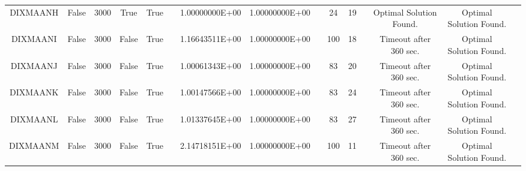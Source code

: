 \begin{longtable}{ccccccccccccccc}
	\cellcolor{default2} DIXMAANH& \cellcolor{default2} False& \cellcolor{default2} 3000& \cellcolor{default2} True& \cellcolor{default2} True& \cellcolor{header} & \cellcolor{best} 1.00000000E+00& \cellcolor{best} 1.00000000E+00& \cellcolor{header} & \cellcolor{ok} 24& \cellcolor{best} 19& \cellcolor{header} & \cellcolor{default2} Optimal Solution Found.& \cellcolor{default2} Optimal Solution Found.& \cellcolor{header} \\
	\cellcolor{default1} DIXMAANI& \cellcolor{default1} False& \cellcolor{default1} 3000& \cellcolor{default1} False& \cellcolor{default1} True& \cellcolor{header} & \cellcolor{poor} 1.16643511E+00& \cellcolor{best} 1.00000000E+00& \cellcolor{header} & \cellcolor{poor} 100& \cellcolor{best} 18& \cellcolor{header} & \cellcolor{default1} Timeout after 360 sec.& \cellcolor{default1} Optimal Solution Found.& \cellcolor{header} \\
	\cellcolor{default2} DIXMAANJ& \cellcolor{default2} False& \cellcolor{default2} 3000& \cellcolor{default2} False& \cellcolor{default2} True& \cellcolor{header} & \cellcolor{poor} 1.00061343E+00& \cellcolor{best} 1.00000000E+00& \cellcolor{header} & \cellcolor{poor} 83& \cellcolor{best} 20& \cellcolor{header} & \cellcolor{default2} Timeout after 360 sec.& \cellcolor{default2} Optimal Solution Found.& \cellcolor{header} \\
	\cellcolor{default1} DIXMAANK& \cellcolor{default1} False& \cellcolor{default1} 3000& \cellcolor{default1} False& \cellcolor{default1} True& \cellcolor{header} & \cellcolor{poor} 1.00147566E+00& \cellcolor{best} 1.00000000E+00& \cellcolor{header} & \cellcolor{poor} 83& \cellcolor{best} 24& \cellcolor{header} & \cellcolor{default1} Timeout after 360 sec.& \cellcolor{default1} Optimal Solution Found.& \cellcolor{header} \\
	\cellcolor{default2} DIXMAANL& \cellcolor{default2} False& \cellcolor{default2} 3000& \cellcolor{default2} False& \cellcolor{default2} True& \cellcolor{header} & \cellcolor{poor} 1.01337645E+00& \cellcolor{best} 1.00000000E+00& \cellcolor{header} & \cellcolor{poor} 83& \cellcolor{best} 27& \cellcolor{header} & \cellcolor{default2} Timeout after 360 sec.& \cellcolor{default2} Optimal Solution Found.& \cellcolor{header} \\
	\cellcolor{default1} DIXMAANM& \cellcolor{default1} False& \cellcolor{default1} 3000& \cellcolor{default1} False& \cellcolor{default1} True& \cellcolor{header} & \cellcolor{poor} 2.14718151E+00& \cellcolor{best} 1.00000000E+00& \cellcolor{header} & \cellcolor{poor} 100& \cellcolor{best} 11& \cellcolor{header} & \cellcolor{default1} Timeout after 360 sec.& \cellcolor{default1} Optimal Solution Found.& \cellcolor{header} \\

\end{longtable}
